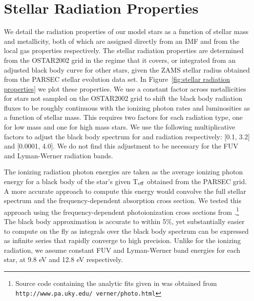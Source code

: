 \documentclass[twocolumn]{aastex61}
\begin{document}
\section{Stellar Radiation Properties}
\label{appendix:radiation}
We detail the radiation properties of our model stars as a function of stellar mass and metallicity, both of which are assigned directly from an IMF and from the local gas properties respectively. The stellar radiation properties are determined from the OSTAR2002 grid \citep{Lanz2003} in the regime that it covers, or integrated from an adjusted black body curve 
    for other stars,
given the ZAMS stellar radius obtained from the PARSEC \citep{Bressan2012,Tang2014} stellar evolution data set. In Figure~\ref{fig:stellar radiation properties} we plot these properties. We use a constant factor across metallicities for stars not sampled on the OSTAR2002 grid to shift the black body radiation fluxes to be roughly continuous with the ionizing photon rates and luminosities as a function of stellar mass. This requires two factors for each radiation type, one for low mass and one for high mass stars. We use the following multiplicative factors to adjust the black body spectrum for  and  radiation respectively: [0.1, 3.2] and [0.0001, 4.0]. We do not find this adjustment to be necessary for the FUV and Lyman-Werner radiation bands.

The ionizing radiation photon energies are taken as the average ionizing photon energy for a black body of the star's given T$_{\rm eff}$ obtained from the PARSEC grid. A more accurate approach to compute this energy would convolve the full stellar spectrum and the frequency-dependent absorption cross section. We tested this approach using the frequency-dependent photoionization cross sections from \citet{1996ApJ...465..487V}.\footnote{Source code containing the analytic fits given in \citet{1996ApJ...465..487V} was obtained from \texttt{http://www.pa.uky.edu/~verner/photo.html}} The black body approximation is accurate to within 5\%, yet substantially easier to compute on the fly as integrals over the black body spectrum can be expressed as infinite series that rapidly converge to high precision. Unlike for the ionizing radiation, we assume constant FUV and Lyman-Werner band energies for each star, at 9.8 eV and 12.8 eV respectively.
\end{document}
